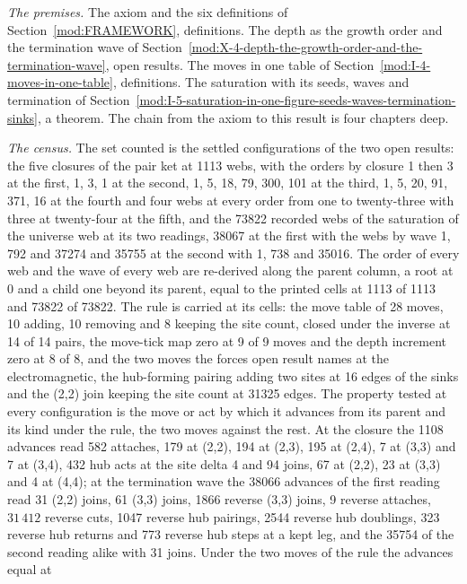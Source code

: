 \begin{chproof}
\textit{The premises.} The axiom and the six definitions of Section~\ref{mod:FRAMEWORK}, definitions. The depth as the growth order and the termination wave of Section~\ref{mod:X-4-depth-the-growth-order-and-the-termination-wave}, open results. The moves in one table of Section~\ref{mod:I-4-moves-in-one-table}, definitions. The saturation with its seeds, waves and termination of Section~\ref{mod:I-5-saturation-in-one-figure-seeds-waves-termination-sinks}, a theorem. The chain from the axiom to this result is four chapters deep.

\textit{The census.} The set counted is the settled configurations of the two open results: the five closures of the pair ket at 1113 webs, with the orders by closure 1 then 3 at the first, 1, 3, 1 at the second, 1, 5, 18, 79, 300, 101 at the third, 1, 5, 20, 91, 371, 16 at the fourth and four webs at every order from one to twenty-three with three at twenty-four at the fifth, and the 73822 recorded webs of the saturation of the universe web at its two readings, 38067 at the first with the webs by wave 1, 792 and 37274 and 35755 at the second with 1, 738 and 35016. The order of every web and the wave of every web are re-derived along the parent column, a root at 0 and a child one beyond its parent, equal to the printed cells at 1113 of 1113 and 73822 of 73822. The rule is carried at its cells: the move table of 28 moves, 10 adding, 10 removing and 8 keeping the site count, closed under the inverse at 14 of 14 pairs, the move-tick map zero at 9 of 9 moves and the depth increment zero at 8 of 8, and the two moves the forces open result names at the electromagnetic, the hub-forming pairing adding two sites at 16 edges of the sinks and the (2,2) join keeping the site count at 31325 edges. The property tested at every configuration is the move or act by which it advances from its parent and its kind under the rule, the two moves against the rest. At the closure the 1108 advances read 582 attaches, 179 at (2,2), 194 at (2,3), 195 at (2,4), 7 at (3,3) and 7 at (3,4), 432 hub acts at the site delta 4 and 94 joins, 67 at (2,2), 23 at (3,3) and 4 at (4,4); at the termination wave the 38066 advances of the first reading read 31 (2,2) joins, 61 (3,3) joins, 1866 reverse (3,3) joins, 9 reverse attaches, $31\,412$ reverse cuts, 1047 reverse hub pairings, 2544 reverse hub doublings, 323 reverse hub returns and 773 reverse hub steps at a kept leg, and the 35754 of the second reading alike with 31 joins. Under the two moves of the rule the advances equal at

\end{chproof}
